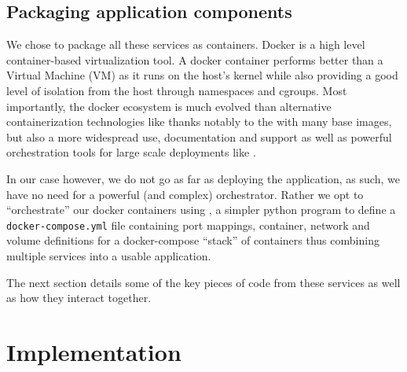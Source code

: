 \documentclass[\version]{l4proj}
\begin{document}
\section{Packaging application components}

We chose to package all these services as \textcite{Docker2020} containers.
Docker is a high level container-based virtualization tool.
A docker container performs better than a Virtual Machine (VM) as it runs on the host's kernel while also providing a good level of isolation from the host through namespaces and cgroups.
Most importantly, the docker ecosystem is much evolved than alternative containerization technologies like \textcite{Lxc2020} thanks notably to the \textcite{DockerHub} with many base images, but also a more widespread use, documentation and support as well as powerful orchestration tools for large scale deployments like \textcite{Kubernetes2020}.

In our case however, we do not go as far as deploying the application, as such, we have no need for a powerful (and complex) orchestrator.
Rather we opt to ``orchestrate'' our docker containers using \textcite{DockerCompose2020}, a simpler python program to define a \verb|docker-compose.yml| file containing port mappings, container, network and volume definitions for a docker-compose ``stack'' of containers thus combining multiple services into a usable application.

The next section details some of the key pieces of code from these services as well as how they interact together.


\chapter{Implementation}
\end{document}

